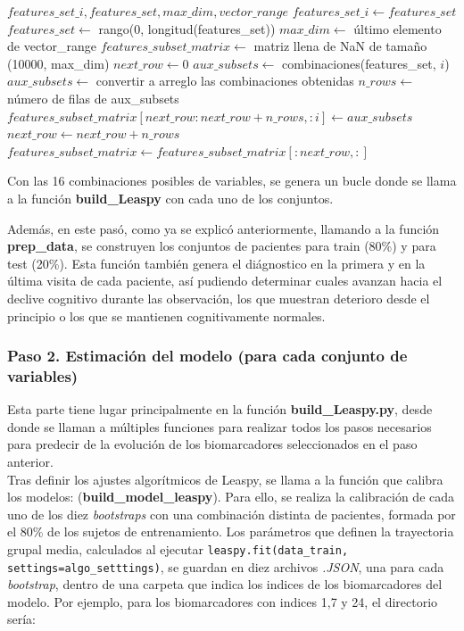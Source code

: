 	
\begin{algorithm}
	\caption{Generación de conjuntos de marcadores}
	\begin{algorithmic}[1]
		\REQUIRE $features\_set\_i, features\_set, max\_dim, vector\_range$
		\STATE $features\_set\_i \gets features\_set$
		\STATE $features\_set \gets$ rango(0, longitud(features\_set))
		\STATE $max\_dim \gets$ último elemento de vector\_range
		\STATE $features\_subset\_matrix \gets$ matriz llena de NaN de tamaño (10000, max\_dim)
		\STATE $next\_row \gets 0$
		\STATE $aux\_subsets \gets$ combinaciones(features\_set, $i$)
		\STATE $aux\_subsets \gets$ convertir a arreglo las combinaciones obtenidas
		\STATE $n\_rows \gets$ número de filas de aux\_subsets
		\STATE $features\_subset\_matrix[next\_row:next\_row+n\_rows, :i] \gets aux\_subsets$
		\STATE $next\_row \gets next\_row + n\_rows$
		\ENDFOR
		\STATE $features\_subset\_matrix \gets features\_subset\_matrix[:next\_row, :]$
	\end{algorithmic}
\end{algorithm}
	
Con las 16 combinaciones posibles de variables, se genera un bucle donde se llama a la función \textbf{build\_Leaspy} con cada uno de los conjuntos.
	
Además, en este pasó, como ya se explicó anteriormente, llamando a la función \textbf{prep\_data}, se construyen los conjuntos de pacientes para train (80\%) y para test (20\%). Esta función también genera el diágnostico en la primera y en la última visita de cada paciente, así pudiendo determinar cuales avanzan hacia el declive cognitivo durante las observación, los que muestran deterioro desde el principio o los que se mantienen cognitivamente normales.\\
	
	
\subsubsection{Paso 2. Estimación del modelo (para cada conjunto de variables)}

Esta parte tiene lugar principalmente en la función \textbf{build\_Leaspy.py}, desde donde se llaman a múltiples funciones para realizar todos los pasos necesarios para predecir de la evolución de los biomarcadores seleccionados en el paso anterior.\\

Tras definir los ajustes algorítmicos de Leaspy, se llama a la función que calibra los modelos: (\textbf{build\_model\_leaspy}). Para ello, se realiza la calibración de cada uno de los diez \textit{bootstraps} con una combinación distinta de pacientes, formada por el 80\% de los sujetos de entrenamiento. Los parámetros que definen la trayectoria grupal media, calculados al ejecutar \texttt{leaspy.fit(data\_train, settings=algo\_setttings)}, se guardan en diez archivos \textit{.JSON}, una para cada \textit{bootstrap}, dentro de una carpeta que indica los indices de los biomarcadores del modelo. Por ejemplo, para los biomarcadores con indices 1,7 y 24, el directorio sería:
	
